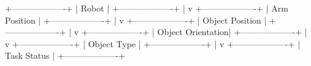 +-------------------+
  |       Robot       |
  +-------------------+
          |
          v
  +-------------------+
  |   Arm Position    |
  +-------------------+
          |
          v
  +-------------------+
  |   Object Position |
  +-------------------+
          |
          v
  +-------------------+
  |   Object Orientation|
  +-------------------+
          |
          v
  +-------------------+
  |   Object Type     |
  +-------------------+
          |
          v
  +-------------------+
  |   Task Status     |
  +-------------------+